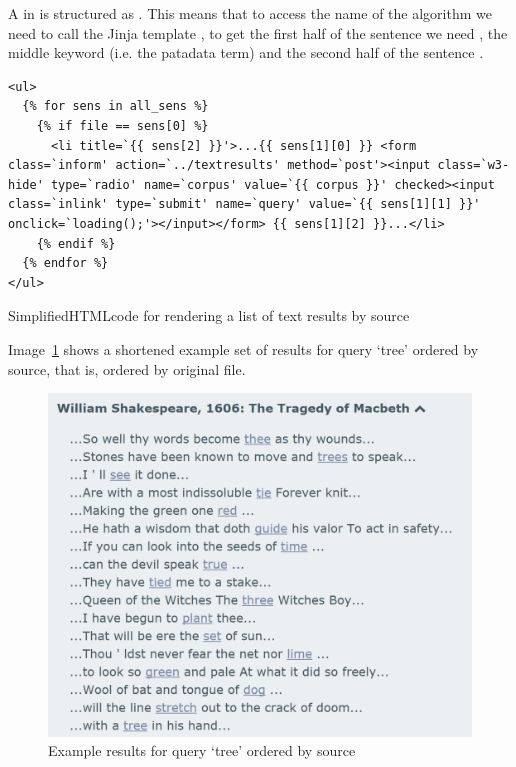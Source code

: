 A  in  is structured as . This means that to access the name of the algorithm we need to call the Jinja template , to get the first half of the sentence we need , the middle keyword (i.e. the patadata term)  and the second half of the sentence .

\begin{listing}[!htbp] %
  \begin{verbatim}
<ul>
  {% for sens in all_sens %}
    {% if file == sens[0] %}
      <li title=`{{ sens[2] }}'>...{{ sens[1][0] }} <form class=`inform' action=`../textresults' method=`post'><input class=`w3-hide' type=`radio' name=`corpus' value=`{{ corpus }}' checked><input class=`inlink' type=`submit' name=`query' value=`{{ sens[1][1] }}' onclick=`loading();'></input></form> {{ sens[1][2] }}...</li>
    {% endif %}
  {% endfor %}
</ul>
  \end{verbatim}
\caption[HTML for results by source]{Simplified\ac{HTML}code for rendering a list of text results by source}
\label{code:textlists}
\end{listing}

Image~\ref{img:listsourcetree} shows a shortened example set of results for query `tree' ordered by source, that is, ordered by original file.

\begin{figure}[!htbp] %
  \centering
  \includegraphics[width=\linewidth]{images/listsourcetree}
\caption[Source result list for query `tree']{Example results for query `tree' ordered by source}
\label{img:listsourcetree}
\end{figure}

